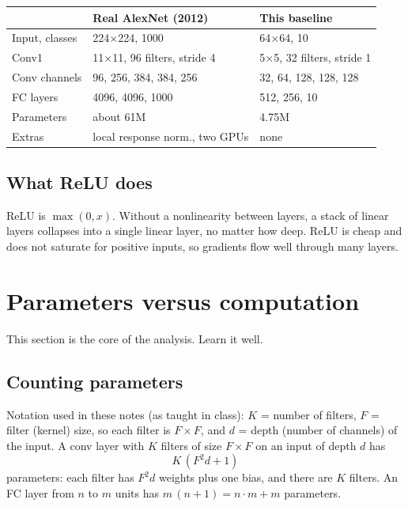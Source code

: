 \documentclass[11pt]{article}
\begin{document}
\begin{center}
\small
\begin{tabular}{lll}
\toprule
 & Real AlexNet (2012) & This baseline \\
\midrule
Input, classes & 224$\times$224, 1000 & 64$\times$64, 10 \\
Conv1 & 11$\times$11, 96 filters, stride 4 & 5$\times$5, 32 filters, stride 1 \\
Conv channels & 96, 256, 384, 384, 256 & 32, 64, 128, 128, 128 \\
FC layers & 4096, 4096, 1000 & 512, 256, 10 \\
Parameters & about 61M & 4.75M \\
Extras & local response norm., two GPUs & none \\
\bottomrule
\end{tabular}
\end{center}

\subsection{What ReLU does}

ReLU is $\max(0,x)$. Without a nonlinearity between layers, a stack of linear layers collapses into a single linear layer, no matter how deep. ReLU is cheap and does not saturate for positive inputs, so gradients flow well through many layers.

\section{Parameters versus computation}\label{sec:params}

This section is the core of the analysis. Learn it well.

\subsection{Counting parameters}

Notation used in these notes (as taught in class): $K$ = number of filters, $F$ = filter (kernel) size, so each filter is $F\times F$, and $d$ = depth (number of channels) of the input. A conv layer with $K$ filters of size $F\times F$ on an input of depth $d$ has
\[
K\,(F^2 d + 1)
\]
parameters: each filter has $F^2 d$ weights plus one bias, and there are $K$ filters. An FC layer from $n$ to $m$ units has $m\,(n+1) = n\cdot m + m$ parameters.
\end{document}
